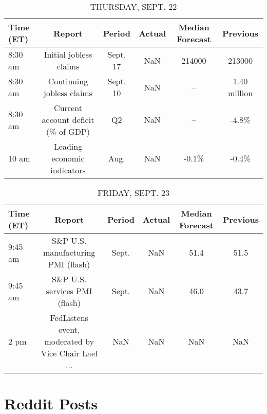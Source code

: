 \documentclass{article}%
\begin{document}
%


\begin{table}[htbp]%
\caption{THURSDAY, SEPT. 22}%
\centering%
\begin{adjustbox}{width=1\textwidth}%
\begin{tabular}{lccccc}
\toprule
Time (ET) &                             Report &   Period & Actual & Median Forecast &     Previous \\
\midrule
  8:30 am &             Initial jobless claims & Sept. 17 &    NaN &          214000 &       213000 \\
  8:30 am &          Continuing jobless claims & Sept. 10 &    NaN &              -- & 1.40 million \\
  8:30 am & Current account deficit (\% of GDP) &       Q2 &    NaN &              -- &        -4.8\% \\
    10 am &        Leading economic indicators &     Aug. &    NaN &           -0.1\% &        -0.4\% \\
\bottomrule
\end{tabular}
%
\end{adjustbox}%
\end{table}

%


\begin{table}[htbp]%
\caption{FRIDAY, SEPT. 23}%
\centering%
\begin{adjustbox}{width=1\textwidth}%
\begin{tabular}{lccccc}
\toprule
Time (ET) &                                             Report & Period & Actual & Median Forecast & Previous \\
\midrule
  9:45 am &                 S\&P U.S. manufacturing PMI (flash) &  Sept. &    NaN &            51.4 &     51.5 \\
  9:45 am &                      S\&P U.S. services PMI (flash) &  Sept. &    NaN &            46.0 &     43.7 \\
     2 pm & FedListens event, moderated by Vice Chair Lael ... &    NaN &    NaN &             NaN &      NaN \\
\bottomrule
\end{tabular}
%
\end{adjustbox}%
\end{table}

%
\section{Reddit Posts}%
\label{sec:RedditPosts}%
\end{document}
